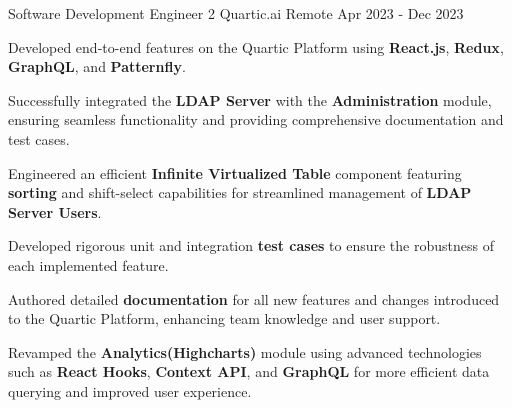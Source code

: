 

\begin{cventries}

  \cventry
    {Software Development Engineer 2}
    {Quartic.ai}
    {Remote}
    {Apr 2023 - Dec 2023}
    {
      \begin{cvitems}
        \item {Developed end-to-end features on the Quartic Platform using \textbf{React.js}, \textbf{Redux}, \textbf{GraphQL}, and \textbf{Patternfly}.}
        \item {Successfully integrated the \textbf{LDAP Server} with the \textbf{Administration} module, ensuring seamless functionality and providing comprehensive documentation and test cases.}
        \item {Engineered an efficient \textbf{Infinite Virtualized Table} component featuring \textbf{sorting} and shift-select capabilities for streamlined management of \textbf{LDAP Server Users}.}
        \item {Developed rigorous unit and integration \textbf{test cases} to ensure the robustness of each implemented feature.}
        \item {Authored detailed \textbf{documentation} for all new features and changes introduced to the Quartic Platform, enhancing team knowledge and user support.}
        \item {Revamped the \textbf{Analytics(Highcharts)} module using advanced technologies such as \textbf{React Hooks}, \textbf{Context API}, and \textbf{GraphQL} for more efficient data querying and improved user experience.}
      \end{cvitems}
    }


\end{cventries}
